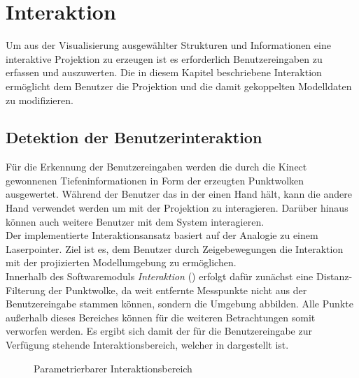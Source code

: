 \chapter{Interaktion}
Um aus der Visualisierung ausgewählter Strukturen und Informationen eine interaktive Projektion zu erzeugen ist es erforderlich Benutzereingaben zu erfassen und auszuwerten. Die in diesem Kapitel beschriebene Interaktion ermöglicht dem Benutzer die Projektion und die damit gekoppelten Modelldaten zu modifizieren.

\section{Detektion der Benutzerinteraktion}
Für die Erkennung der Benutzereingaben werden die durch die Kinect gewonnenen Tiefeninformationen in Form der erzeugten Punktwolken ausgewertet. Während der Benutzer das \kps{} in der einen Hand hält, kann die andere Hand verwendet werden um mit der Projektion zu interagieren. Darüber hinaus können auch weitere Benutzer mit dem System interagieren.\\

Der implementierte Interaktionsansatz basiert auf der Analogie zu einem Laserpointer. Ziel ist es, dem Benutzer durch Zeigebewegungen die Interaktion mit der projizierten Modellumgebung zu ermöglichen.\\
Innerhalb des Softwaremoduls \textit{Interaktion} () erfolgt dafür zunächst eine Distanz-Filterung der Punktwolke, da weit entfernte Messpunkte nicht aus der Benutzereingabe stammen können, sondern die Umgebung abbilden. Alle Punkte außerhalb dieses Bereiches können für die weiteren Betrachtungen somit verworfen werden. Es ergibt sich damit der für die Benutzereingabe zur Verfügung stehende Interaktionsbereich, welcher in  dargestellt ist.\\

\begin{figure}[!ht]
	\begin{center}
		\caption{Parametrierbarer Interaktionsbereich}
		\label{fig.intfov}
	\end{center}
\end{figure}

